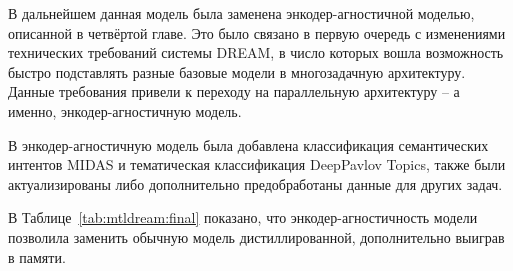 В дальнейшем данная модель была заменена энкодер-агностичной моделью, описанной в четвёртой главе. Это было связано в первую очередь с изменениями технических требований системы DREAM, в число которых вошла возможность быстро подставлять разные базовые модели в многозадачную архитектуру. Данные требования привели к переходу на параллельную архитектуру -- а именно, энкодер-агностичную модель.


В энкодер-агностичную модель была добавлена классификация семантических интентов MIDAS и тематическая классификация DeepPavlov Topics, также были актуализированы либо дополнительно предобработаны данные для других задач.

В Таблице~\ref{tab:mtldream:final} показано, что энкодер-агностичность модели позволила заменить обычную модель дистиллированной, дополнительно выиграв в памяти.

